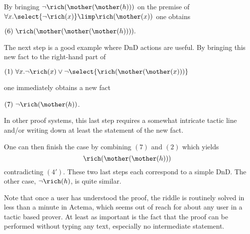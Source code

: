 By bringing 
$\neg\rich(\mother(\mother(h)))$ on the premise of $\forall
x. \select{\neg\rich(x)} \limp \rich(\mother(x))$
one obtains

\medskip
$(6) ~\rich(\mother(\mother(\mother(h)))).$
\medskip

The next step is a good example where DnD actions are useful. By bringing this
new fact to the right-hand part of

\medskip
$(1)~\forall x. \neg\rich(x)\lor \neg\select{\rich(\mother(\mother(x)))}$
\medskip

\noindent
one immediately obtains a new fact

\medskip
$(7) ~\neg{\rich(\mother(h))}$.
\medskip

\noindent In other proof systems, this last step requires a somewhat intricate
tactic line and/or writing down at least the statement of the new fact.

One can then finish the case by combining $(7)$ and $(2)$ which yields
$$\rich(\mother(\mother(h)))$$ contradicting $(4')$. These two last steps each
correspond to a simple DnD. The other case, $\neg\rich(h)$, is quite similar.

Note that once a user has understood the proof, the riddle is routinely solved
in less than a minute in Actema, which seems out of reach for about any user in
a tactic based prover. At least as important is the fact that the proof can be
performed without typing any text, especially no intermediate statement. 

